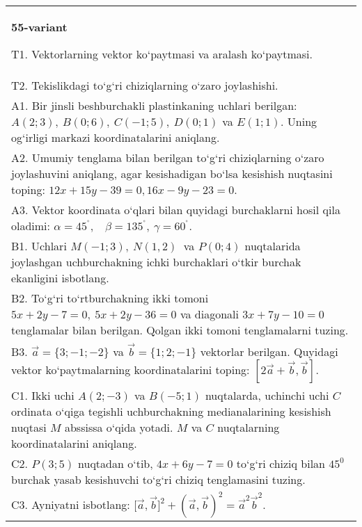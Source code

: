 \documentclass{article}
\begin{document}
\begin{tabular}{m{17cm}}
\textbf{55-variant}
\newline

T1. 
Vektorlarning vektor ko‘paytmasi va aralash ko‘paytmasi.
 \\
T2. 
Tekislikdagi to‘g‘ri chiziqlarning o‘zaro joylashishi.
 \\
A1. 
Bir jinsli beshburchakli plastinkaning uchlari berilgan:
$A (2;3), \ B (0;6), \ C (-1;5), \ D (0;1) $ va $E (1;1) $. Uning og‘irligi
markazi koordinatalarini aniqlang.
 \\
A2. 
Umumiy tenglama bilan berilgan to‘g‘ri chiziqlarning
o‘zaro joylashuvini aniqlang, agar kesishadigan bo‘lsa kesishish nuqtasini
toping: $12x+15y-39=0, 16x-9y-23=0$.
 \\
A3. 
Vektor koordinata o‘qlari bilan quyidagi burchaklarni hosil qila oladimi:
$\alpha = 45^{{^\circ}},\ \ \ \ \beta = 135^{{^\circ}},\ \gamma = 60^{{^\circ}}$.
 \\
B1. 
Uchlari \(M (-1;3),\ N (1,2) \ \) va \(P (0;4) \)
nuqtalarida joylashgan uchburchakning ichki burchaklari o‘tkir burchak
ekanligini isbotlang.
 \\
B2. 
To‘g‘ri to‘rtburchakning ikki tomoni
\(5x+2y-7=0,\ 5x+2y-36=0\) va diagonali
\(3x+7y-10=0\) tenglamalar bilan berilgan. Qolgan ikki tomoni
tenglamalarni tuzing.
 \\
B3. 
$\vec{a} = \{ 3; - 1; - 2\}$ va $\vec{b} = \{ 1;2; - 1\}$ vektorlar berilgan. Quyidagi vektor ko‘paytmalarning koordinatalarini toping:
$\left\lbrack 2\vec{a} + \vec{b},\vec{b} \right\rbrack$.
 \\
C1. 
Ikki uchi \(A (2; - 3) \) va \(B (-5;1) \) nuqtalarda,
uchinchi uchi $C$ ordinata o‘qiga tegishli uchburchakning
medianalarining kesishish nuqtasi $M$ abssissa o‘qida yotadi.
$M$ va $C$ nuqtalarning koordinatalarini aniqlang.
 \\
C2. 
\(P (3;5) \) nuqtadan o‘tib, \(4x + 6y - 7 = 0\) to‘g‘ri chiziq
bilan \(45^{0}\) burchak yasab kesishuvchi to‘g‘ri chiziq tenglamasini tuzing.
 \\
C3. 
Ayniyatni isbotlang: \(\lbrack\vec{a},\vec{b}\rbrack^{2} + (\vec{a},\vec{b}) ^{2} = {\vec{a}}^{2}{\vec{b}}^{2}\).
 \\

\end{tabular}
\vspace{1cm}
\end{document}
